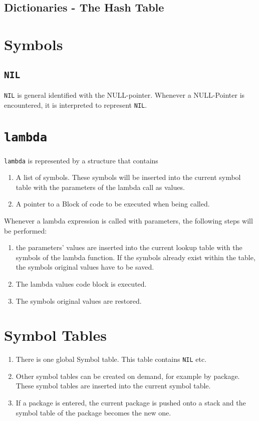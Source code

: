 \documentclass[12pt]{article}
\begin{document}
\subsection{Dictionaries - The Hash Table}


\section{Symbols}

\subsection{\texttt{NIL}}

\texttt{NIL} is general identified with the NULL-pointer. Whenever a
NULL-Pointer is encountered, it is interpreted to represent \texttt{NIL}.


\section{\texttt{lambda}}

\texttt{lambda} is represented by a structure that contains 

\begin{enumerate}
\item A list of symbols. These symbols will be inserted into the current symbol
table with the parameters of the lambda call as values. 
\item A pointer to a Block of code to be executed when being called.
\end{enumerate}

Whenever a lambda expression is called with parameters, the following steps will
be performed:

\begin{enumerate}
\item  the parameters' values are inserted into the current lookup table  with the 
symbols of the lambda function. If the symbols already exist within the table,
the symbols original values have to be saved.
\item The lambda values code block is executed.
\item The symbols original values are restored.
\end{enumerate}


\section{Symbol Tables}

\begin{enumerate}
\item There is one global Symbol table. This table contains \texttt{NIL} etc.
\item Other symbol tables can be created on demand, for example by package.
These symbol tables are inserted into the current symbol table.
\item If a package is entered, the current package is pushed onto a stack and
the symbol table of the package becomes the new one.
\end{enumerate}
\end{document}
